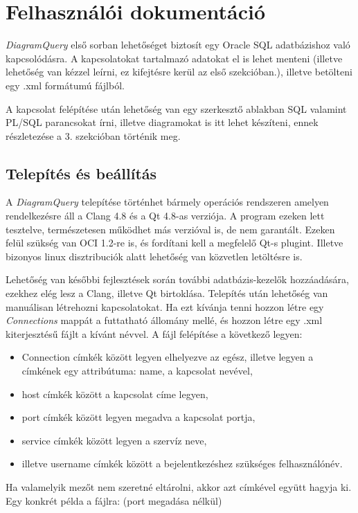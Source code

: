 \chapter{Felhasználói dokumentáció}
\textit{DiagramQuery} első sorban lehetőséget biztosít egy Oracle SQL adatbázishoz való kapcsolódásra.
A kapcsolatokat tartalmazó adatokat el is lehet menteni (illetve lehetőség van kézzel leírni,
ez kifejtésre kerül az első szekcióban.), illetve betölteni egy .xml formátumú fájlból.

A kapcsolat felépítése után lehetőség van egy szerkesztő ablakban SQL valamint PL/SQL parancsokat írni,
illetve diagramokat is itt lehet készíteni, ennek részletezése a 3. szekcióban történik meg.

\section{Telepítés és beállítás}
A \textit{DiagramQuery} telepítése történhet bármely operációs rendszeren amelyen rendelkezésre áll a
Clang 4.8 és a Qt 4.8-as verziója. A program ezeken lett tesztelve, természetesen működhet más verzióval is,
de nem garantált. Ezeken felül szükség van OCI 1.2-re is, és fordítani kell a megfelelő Qt-s plugint.
Illetve bizonyos linux disztribuciók alatt lehetőség van közvetlen letöltésre is.

Lehetőség van későbbi fejlesztések során további adatbázis-kezelők hozzáadására, ezekhez elég lesz a Clang, illetve Qt birtoklása.
Telepítés után lehetőség van manuálisan létrehozni kapcsolatokat. Ha ezt kívánja tenni hozzon létre egy
\textit{Connections} mappát a futtatható állomány mellé, és hozzon létre egy .xml kiterjesztésű fájlt a kívánt névvel.
A fájl felépítése a következő legyen:
\begin{itemize}
  \item Connection címkék között legyen elhelyezve az egész, illetve legyen a címkének egy attribútuma: name, a kapcsolat nevével,
  \item host címkék között a kapcsolat címe legyen,
  \item port címkék között legyen megadva a kapcsolat portja,
  \item service címkék között legyen a szervíz neve,
  \item illetve username címkék között a bejelentkezéshez szükséges felhasználónév.
\end{itemize}
Ha valamelyik mezőt nem szeretné eltárolni, akkor azt címkével együtt hagyja ki.
Egy konkrét példa a fájlra: (port megadása nélkül)

